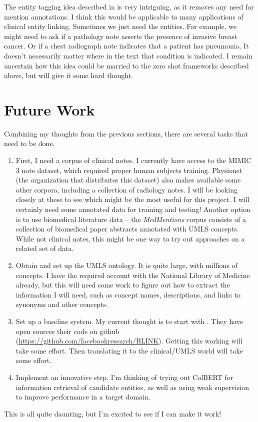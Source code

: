\documentclass{article}
\begin{document}
The entity tagging idea described in \cite{du_entity_2022} is very intriguing, as it removes any need for mention annotations. I think this would be applicable to many applications of clinical entity linking. Sometimes we just need the entities. For example, we might need to ask if a pathology note asserts the presence of invasive breast cancer. Or if a chest radiograph note indicates that a patient has pneumonia. It doesn't necessarily matter where in the text that condition is indicated. I remain uncertain how this idea could be married to the zero shot frameworks described above, but will give it some hard thought.

\section{Future Work}

Combining my thoughts from the previous sections, there are several tasks that need to be done.

\begin{enumerate}
\item First, I need a corpus of clinical notes. I currently have access to the MIMIC 3 note dataset, which required proper human subjects training. Physionet (the organization that distributes this dataset) also makes available some other corpora, including a collection of radiology notes. I will be looking closely at these to see which might be the most useful for this project. I will certainly need some annotated data for training and testing! Another option is to use biomedical literature data -- the \emph{MedMentions} corpus consists of a collection of biomedical paper abstracts annotated with UMLS concepts. While not clinical notes, this might be one way to try out approaches on a related set of data.
\item Obtain and set up the UMLS ontology. It is quite large, with millions of concepts. I have the required account with the National Library of Medicine already, but this will need some work to figure out how to extract the information I will need, such as concept names, descriptions, and links to synonyms and other concepts.
\item Set up a baseline system. My current thought is to start with \cite{wu_scalable_2020}. They have open sources their code on github (\url{https://github.com/facebookresearch/BLINK}). Getting this working will take some effort. Then translating it to the clinical/UMLS world will take some effort.
\item Implement an innovative step. I'm thinking of trying out ColBERT for information retrieval of candidate entities, as well as using weak supervision to improve performance in a target domain.
\end{enumerate}

This is all quite daunting, but I'm excited to see if I can make it work!

\medskip
\printbibliography
\end{document}
